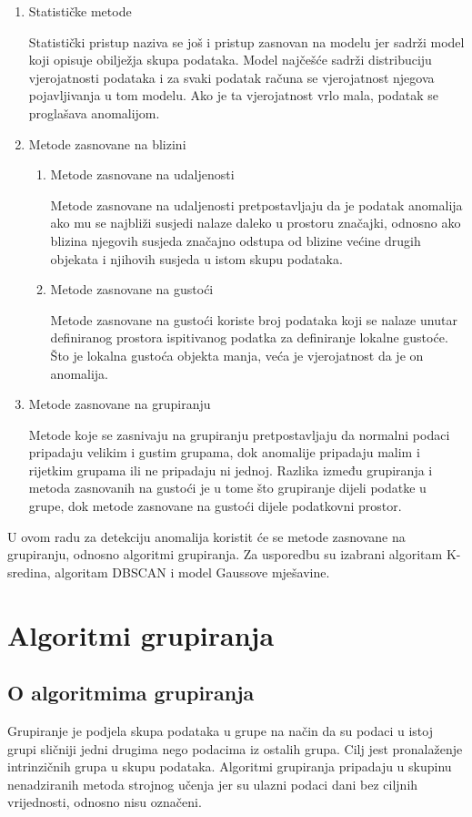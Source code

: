 \documentclass[utf8, diplomski, numeric]{fer}
\begin{document}
\begin{enumerate}
\item Statističke metode

Statistički pristup naziva se još i pristup zasnovan na modelu jer sadrži model koji opisuje obilježja skupa podataka. Model najčešće sadrži distribuciju vjerojatnosti podataka i za svaki podatak računa se vjerojatnost njegova pojavljivanja u tom modelu. Ako je ta vjerojatnost vrlo mala, podatak se proglašava anomalijom.
\item Metode zasnovane na blizini

\begin{enumerate}
\item Metode zasnovane na udaljenosti

Metode zasnovane na udaljenosti pretpostavljaju da je podatak anomalija ako mu se najbliži susjedi nalaze daleko u prostoru značajki, odnosno ako blizina njegovih susjeda značajno odstupa od blizine većine drugih objekata i njihovih susjeda u istom skupu podataka.
\item Metode zasnovane na gustoći

Metode zasnovane na gustoći koriste broj podataka koji se nalaze unutar definiranog prostora ispitivanog podatka za definiranje lokalne gustoće. Što je lokalna gustoća objekta manja, veća je vjerojatnost da je on anomalija.
\end{enumerate}
\item Metode zasnovane na grupiranju

Metode koje se zasnivaju na grupiranju pretpostavljaju da normalni podaci pripadaju velikim i gustim grupama, dok anomalije pripadaju malim i rijetkim grupama ili ne pripadaju ni jednoj. Razlika između grupiranja i metoda zasnovanih na gustoći je u tome što grupiranje dijeli podatke u grupe, dok metode zasnovane na gustoći dijele podatkovni prostor.
\end{enumerate}
U ovom radu za detekciju anomalija koristit će se metode zasnovane na grupiranju, odnosno algoritmi grupiranja. Za usporedbu su izabrani algoritam K-sredina, algoritam DBSCAN i model Gaussove mješavine.


\chapter{Algoritmi grupiranja}
\section{O algoritmima grupiranja}
Grupiranje je podjela skupa podataka u grupe na način da su podaci u istoj grupi sličniji jedni drugima nego podacima iz ostalih grupa. Cilj jest pronalaženje intrinzičnih grupa u skupu podataka. Algoritmi grupiranja pripadaju u skupinu nenadziranih metoda strojnog učenja jer su ulazni podaci dani bez ciljnih vrijednosti, odnosno nisu označeni. 
\end{document}
